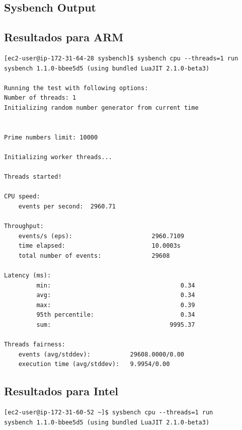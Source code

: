 \documentclass[a4paper,openright,12pt]{article}
\begin{document}
\clearpage
\begin{appendices}
\addappheadtotoc
\appendixpage

\section{Sysbench Output}\label{anexo:sysbench_output}
\subsection{Resultados para ARM}
\begin{verbatim}
[ec2-user@ip-172-31-64-28 sysbench]$ sysbench cpu --threads=1 run
sysbench 1.1.0-bbee5d5 (using bundled LuaJIT 2.1.0-beta3)

Running the test with following options:
Number of threads: 1
Initializing random number generator from current time


Prime numbers limit: 10000

Initializing worker threads...

Threads started!

CPU speed:
    events per second:  2960.71

Throughput:
    events/s (eps):                      2960.7109
    time elapsed:                        10.0003s
    total number of events:              29608

Latency (ms):
         min:                                    0.34
         avg:                                    0.34
         max:                                    0.39
         95th percentile:                        0.34
         sum:                                 9995.37

Threads fairness:
    events (avg/stddev):           29608.0000/0.00
    execution time (avg/stddev):   9.9954/0.00
\end{verbatim}
\newpage
\subsection{Resultados para Intel}
\begin{verbatim}
[ec2-user@ip-172-31-60-52 ~]$ sysbench cpu --threads=1 run
sysbench 1.1.0-bbee5d5 (using bundled LuaJIT 2.1.0-beta3)


\end{verbatim}
\end{appendices}
\end{document}
